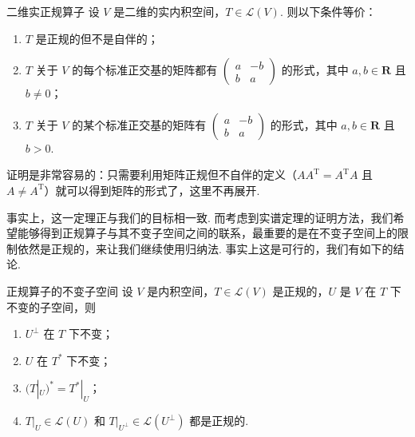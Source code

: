 \begin{theorem}{}{二维实正规算子}
    设 $ V $ 是二维的实内积空间，$ T \in \mathcal{L}(V) $. 则以下条件等价：
    \begin{enumerate}
        \item $ T $ 是正规的但不是自伴的；

        \item $ T $ 关于 $ V $ 的每个标准正交基的矩阵都有 $ \begin{pmatrix} a & -b \\ b & a \end{pmatrix} $ 的形式，其中 $ a, b \in \mathbf{R} $ 且 $ b \neq 0 $；

        \item $ T $ 关于 $ V $ 的某个标准正交基的矩阵有 $ \begin{pmatrix} a & -b \\ b & a \end{pmatrix} $ 的形式，其中 $ a, b \in \mathbf{R} $ 且 $ b > 0 $.
    \end{enumerate}
\end{theorem}

证明是非常容易的：只需要利用矩阵正规但不自伴的定义（$ A A^\mathrm{T} = A^\mathrm{T} A $ 且 $ A \neq A^\mathrm{T} $）就可以得到矩阵的形式了，这里不再展开.

事实上，这一定理正与我们的目标相一致. 而考虑到实谱定理的证明方法，我们希望能够得到正规算子与其不变子空间之间的联系，最重要的是在不变子空间上的限制依然是正规的，来让我们继续使用归纳法. 事实上这是可行的，我们有如下的结论.

\begin{theorem}{}{正规算子的不变子空间}
    设 $ V $ 是内积空间，$ T \in \mathcal{L}(V) $ 是正规的，$ U $ 是 $ V $ 在 $ T $ 下不变的子空间，则
    \begin{enumerate}
        \item $ U^{\perp} $ 在 $ T $ 下不变；

        \item $ U $ 在 $ T^* $ 下不变；

        \item $ (T|_U)^* = T^*|_U $；

        \item $ T|_U \in \mathcal{L}(U) $ 和 $ T|_{U^{\perp }} \in \mathcal{L}(U^{\perp }) $ 都是正规的.
    \end{enumerate}
\end{theorem}

